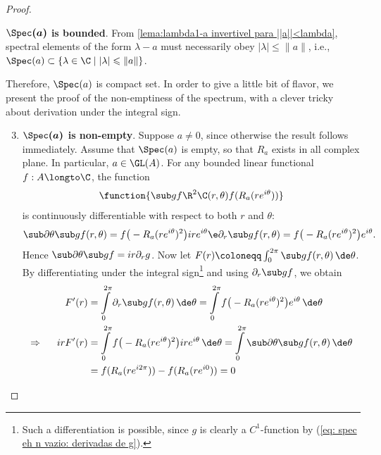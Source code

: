 \begin{proof}
\begin{itroman}
\item \label{teo item:spec eh limitado}\textbf{$\boldsymbol{\Spec(a)}$ is bounded}. From \ref{lema:lambda1-a invertivel para ||a||<lambda}, spectral elements of the form $\lambda-a$ must necessarily obey $|\lambda| \leq \|a\|$, i.e., $\Spec(a) \subset \{\lambda \in \C \mid |\lambda|\leqslant\|a\|\}$.
\end{itroman}
Therefore, $\Spec(a)$ is compact set. In order to give a little bit of flavor, we present the proof of \cite{singh2006spectrum} the non-emptiness of the spectrum, with a clever tricky about derivation under the integral sign.
\begin{enumerate}[label=\ensuremath{(\roman*)}]
    \setcounter{enumi}{2}
\item \label{teo item:spec eh n vazio}\textbf{$\boldsymbol{\Spec(a)}$ is non-empty}. Suppose $a\neq 0$, since otherwise the result follows immediately. Assume that $\Spec(a)$ is empty, so that $R_a$ exists in all complex plane. In particular, $a \in \GL(A)$. For any bounded linear functional $f: A\longto \C$, the function 
\begin{equation*}
    \function{{\sub gf}{\R^2}{\C}{(r,\theta)}{f(R_a(re^{i\theta}))}}
\end{equation*}
is continuously differentiable with respect to both $r$ and $\theta$:
\begin{equation}
\label{eq: spec eh n vazio: derivadas de g}
    \sub\partial\theta {\sub gf}(r, \theta)=f\big(-R_a(r e^{i \theta})^{2}\big) i r e^{i \theta} \e
\partial_r{\sub gf}(r, \theta)=f\big(-R_a(r e^{i \theta})^{2}\big) e^{i \theta}.
\end{equation}
Hence $\sub\partial\theta {\sub gf} = ir\partial_rg$. Now let $F(r)\coloneqq \int_{0}^{2 \pi} {\sub gf}(r, \theta)\,\de\theta$. By differentiating under the integral sign\footnote{Such a differentiation is possible, since $g$ is clearly a $C^{1}$-function by (\ref{eq: spec eh n vazio: derivadas de g}).} and using $\partial_r{\sub gf}$, we obtain
\[
\begin{aligned}
F^{\prime}(r)&=\int\limits_{0}^{2 \pi} \partial_r{\sub gf}(r, \theta)\,\de\theta=\int\limits_{0}^{2 \pi} f\big(-R_a(r e^{i \theta})^2\big) e^{i \theta} \,\de\theta\\
\Rightarrow \hspace{0.5cm} ir F^{\prime}(r) &=\int\limits_{0}^{2 \pi} f\big(-R_a(r e^{i \theta})^{2}\big) i r e^{i \theta} \,\de\theta=\int\limits_{0}^{2 \pi} \sub\partial\theta {\sub gf}(r, \theta) \,\de \theta \\
&=f(R_a(r e^{i 2\pi}))-f(R_a(r e^{i 0}))=0\\

\end{aligned}\]
\end{enumerate}
\end{proof}
